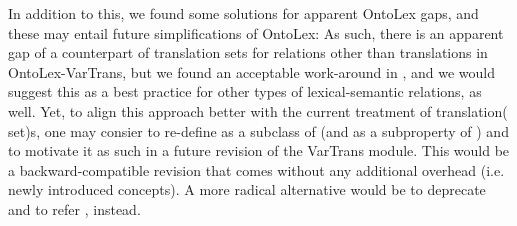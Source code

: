 In addition to this, we found some solutions for apparent OntoLex gaps, and these may entail future simplifications of OntoLex:
As such, there is an apparent gap of a counterpart of translation sets for relations other than translations in OntoLex-VarTrans, 
but we found an acceptable work-around in , and we would suggest this as a best practice for other types of lexical-semantic relations, as well. Yet, to align this approach better with the current treatment of translation( set)s, one may consier to  re-define  as a subclass of  (and  as a subproperty of ) and to motivate it as such in a future revision of the VarTrans module. This would be a backward-compatible revision that comes without any additional overhead (i.e. newly introduced concepts). A more radical alternative would be to deprecate  and to refer , instead.

